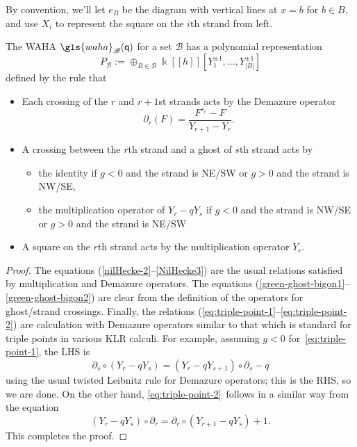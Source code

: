 \documentclass[ALCO,ThmDefs,Unicode,epreuves]{cedram}
\newcommand{\ck}{g}
\newcommand{\pq}{\mathsf{q}}
\newcommand{\K}{\Bbbk}%
\newcommand{\waha}{\gls{waha}}
\newcommand\llbracket{[\![}
\newcommand\rrbracket{]\!]}
\begin{document}
By convention, we'll let $e_{B}$ be the diagram with vertical lines at
$x=b$ for $b\in B$, and use $X_i$ to represent the square on the $i$th
strand from left.
\begin{prop}\label{W-poly}
 The WAHA $\waha_{\mathscr{B}}(\pq)$ for a set $\mathscr{B}$ has a polynomial representation
 \[P_{\mathscr{B}} := \oplus_{B\in \mathscr{B}}\K\llbracket h\rrbracket [Y_1^{\pm 1},\dots,
 Y_{|B|}^{\pm 1}]\]
defined by the rule that 
\begin{itemize}
\item Each crossing of the $r$ and $r+1$st strands acts by the Demazure operator \[\partial_r(F)=
 \frac{F^{s_r}-F}{Y_{r+1}-Y_{r}}.\]
\item 
A crossing between the $r$th strand and a ghost of $s$th strand acts
by
\begin{itemize}
\item the identity if $\ck <0$ and the
 strand is NE/SW or $\ck >0$ and the strand is NW/SE,
\item the multiplication operator of $Y_r-qY_s$ if $\ck <0$ and
 the strand is NW/SE or $\ck >0$ and the strand is NE/SW
\end{itemize}
\item A square on the $r$th strand acts by the multiplication operator
 $Y_r$. 
\end{itemize}
\end{prop}
\begin{proof}
The equations (\ref{nilHecke-2}--\ref{NilHecke3}) are the usual
relations satisfied by multiplication and Demazure operators. The 
equations (\ref{green-ghost-bigon1}--\ref{green-ghost-bigon2}) are clear from
the definition of the operators for ghost/strand crossings. Finally,
the relations (\ref{eq:triple-point-1}--\ref{eq:triple-point-2}) are
calculation with Demazure operators similar to that which is standard
for triple points in various KLR calculi.
For example, assuming $\ck<0$ for~\eqref{eq:triple-point-1}, the
LHS is \[\partial_s\circ (Y_r-qY_s)=(Y_r-qY_{s+1})\circ\partial_s-q\]
using the usual twisted Leibnitz rule for Demazure operators; this is
the RHS, so we are done. On the other hand,
\eqref{eq:triple-point-2}~follows in a similar way from the equation
\[(Y_r-qY_s)\circ\partial_r = \partial_r \circ (Y_{r+1}-qY_s)+1.\] This
completes the proof.
\end{proof}
\end{document}
